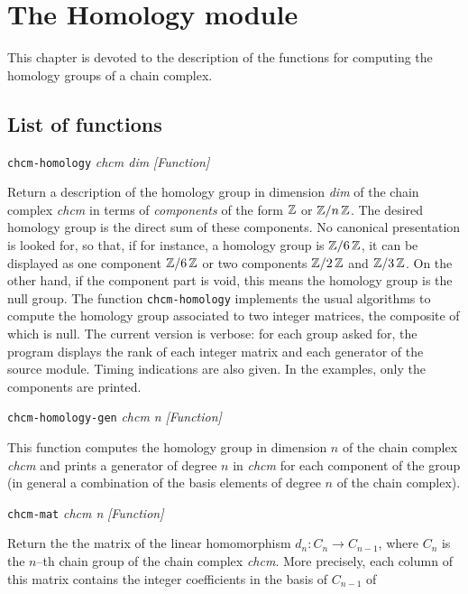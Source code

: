 \chapter {The Homology module}

This chapter is devoted to the description of the functions for
computing the homology groups of a chain complex.

\section {List of functions}

{\parindent=0mm
{\leftskip=5mm
{\tt chcm-homology} {\em chcm dim} \hfill {\em [Function]} \par}
{\leftskip=15mm
Return a description  of the homology group in dimension {\em dim} of the chain complex {\em chcm}
in terms of {\em components} of the form ${{\Bbb Z}}$ or ${{\Bbb Z}}/{n\, {{\Bbb Z}}}$. 
The desired homology group is the direct sum of these 
components. No canonical presentation is looked for, so that, if for instance, 
a homology group is ${{\Bbb Z}}/{6\, {{\Bbb Z}}}$, it can be displayed as one component
${{\Bbb Z}}/{6\, {{\Bbb Z}}}$ or two components ${{\Bbb Z}}/{2\, {{\Bbb Z}}}$ and ${{\Bbb Z}}/{3\, {{\Bbb Z}}}$.
On the other hand, if the component part  is void, this  means  the homology 
group is the null group. The function {\tt chcm-homology} implements the
usual algorithms to compute the homology group associated to two integer matrices,
the composite of which is null. The current version is verbose: for each group asked for,
the program displays the rank of each integer matrix and each generator of the source
module. Timing indications are also given. In the examples, only the  components are printed.
\par }
{\leftskip=5mm 
{\tt chcm-homology-gen} {\em chcm n} \hfill {\em [Function]} \par}
{\leftskip=15mm 
This function computes the homology group in dimension $n$ of the chain complex
{\em chcm} and prints a generator of degree $n$ in {\em chcm} for each component of 
the group (in general a combination of the  basis elements of degree $n$ of the
chain complex).\par}
{\leftskip=5mm 
{\tt chcm-mat} {\em chcm n} \hfill {\em [Function]} \par}
{\leftskip=15mm 
Return the   the  matrix of the li\-ne\-ar homomorphism 
$d_n: C_n \rightarrow C_{n-1}$, where
$C_n$ is the $n$--th chain group   of the chain complex  {\em chcm}. More precisely,
each column  of this matrix contains the integer coefficients in the basis of $C_{n-1}$ of 
}}
